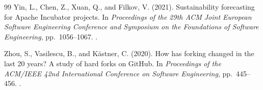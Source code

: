 \begin{thebibliography}{99}
Yin, L., Chen, Z., Xuan, Q., and Filkov, V. (2021).
Sustainability forecasting for Apache Incubator projects.
In \emph{Proceedings of the 29th ACM Joint European Software Engineering Conference and Symposium on the Foundations of Software Engineering}, pp.~1056--1067.
.

Zhou, S., Vasilescu, B., and Kästner, C. (2020).
How has forking changed in the last 20 years? A study of hard forks on GitHub.
In \emph{Proceedings of the ACM/IEEE 42nd International Conference on Software Engineering}, pp.~445--456.
.
\end{thebibliography}
\endgroup
